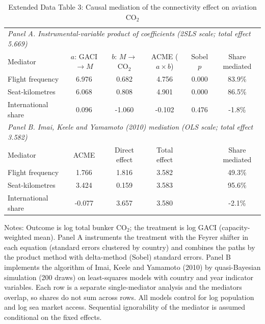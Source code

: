 \documentclass[12pt]{article}
\begin{document}
\begin{table}[htbp]
\centering
\begin{threeparttable}
\caption{Extended Data Table 3: Causal mediation of the connectivity effect on aviation CO$_2$}
\label{tab:mediation}
\footnotesize
\begin{tabular}{lccccc}
\toprule
\multicolumn{6}{l}{\textit{Panel A. Instrumental-variable product of coefficients (2SLS scale; total effect 5.669)}} \\
Mediator & $a$: GACI$\rightarrow M$ & $b$: $M\rightarrow$CO$_2$ & ACME ($a\times b$) & Sobel $p$ & Share mediated \\
\midrule
  Flight frequency & 6.976 & 0.682 & 4.756 & 0.000 & 83.9\% \\
  Seat-kilometres & 6.068 & 0.808 & 4.901 & 0.000 & 86.5\% \\
  International share & 0.096 & -1.060 & -0.102 & 0.476 & -1.8\% \\
\midrule
\multicolumn{6}{l}{\textit{Panel B. Imai, Keele and Yamamoto (2010) mediation (OLS scale; total effect 3.582)}} \\
Mediator & ACME & Direct effect & Total effect & & Share mediated \\
\midrule
  Flight frequency & 1.766 & 1.816 & 3.582 & & 49.3\% \\
  Seat-kilometres & 3.424 & 0.159 & 3.583 & & 95.6\% \\
  International share & -0.077 & 3.657 & 3.580 & & -2.1\% \\
\bottomrule
\end{tabular}
\begin{tablenotes}[flushleft]
\footnotesize
\item Notes: Outcome is log total bunker CO$_2$; the treatment is log GACI (capacity-weighted mean). Panel A instruments the treatment with the Feyrer shifter in each equation (standard errors clustered by country) and combines the paths by the product method with delta-method (Sobel) standard errors. Panel B implements the algorithm of Imai, Keele and Yamamoto (2010) by quasi-Bayesian simulation (200 draws) on least-squares models with country and year indicator variables. Each row is a separate single-mediator analysis and the mediators overlap, so shares do not sum across rows. All models control for log population and log sea market access. Sequential ignorability of the mediator is assumed conditional on the fixed effects.
\end{tablenotes}
\end{threeparttable}
\end{table}
\end{document}
